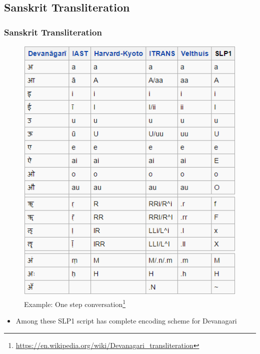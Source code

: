 \documentclass[xcolor=dvipsnames]{beamer}
\begin{document}
\subsection{Sanskrit Transliteration}


\begin{frame}
\frametitle{Sanskrit Transliteration}
\begin{figure}
	\includegraphics[scale=0.35]{img/transliteration.png} 
 	\caption{\tiny{Example: One step conversation\footnote{\url{https://en.wikipedia.org/wiki/Devanagari_transliteration}}}}
 \end{figure}
 
 \begin{itemize}
 \item Among these SLP1 script has complete encoding scheme for Devanagari
  
  
 \end{itemize}
 
\end{frame}
\end{document}
